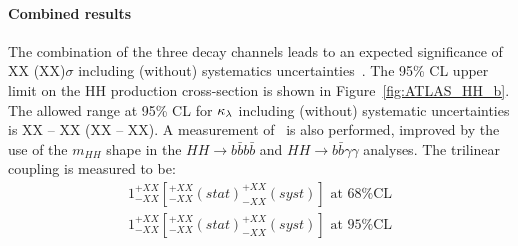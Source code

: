%
\paragraph{Combined results}

The combination of the three decay channels leads to an expected significance of XX (XX)$\sigma$ including (without) systematics uncertainties~\cite{ATLASHHPUBnote}. The 95\% CL upper limit on the HH production cross-section is shown in Figure~\ref{fig:ATLAS_HH_b}. The allowed range at 95\% CL for $\kappa_{\lambda}$ including (without) systematic uncertainties is XX -- XX (XX -- XX). A measurement of \lHHH\ is also performed, improved by the use of the $m_{HH}$ shape in the $HH \rightarrow b\bar{b}b\bar{b}$ and $HH \rightarrow b\bar{b}\gamma\gamma$ analyses. The trilinear coupling is measured to be:
\[
\begin{split}
1^{+XX}_{-XX} [^{+XX}_{-XX} (stat) ^{+XX}_{-XX} (syst)] \text{ at 68\% CL} \\
1^{+XX}_{-XX} [^{+XX}_{-XX} (stat) ^{+XX}_{-XX} (syst)] \text{ at 95\% CL}
\end{split}
\]